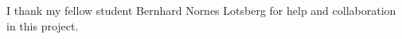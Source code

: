 \documentclass{emulateapj}
\begin{document}
	
	
	
	\begin{acknowledgements}
		I thank my fellow student Bernhard Nornes Lotsberg for help and collaboration in this project.
	\end{acknowledgements}

	
	
\end{document}
